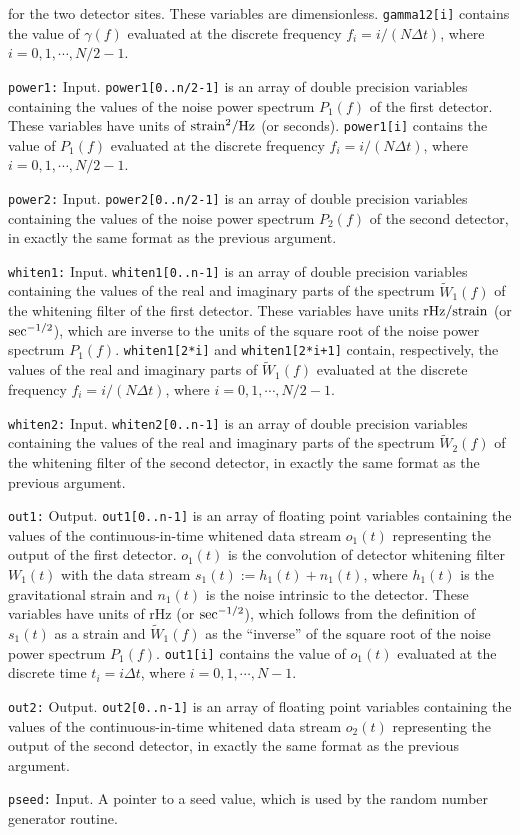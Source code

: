 \begin{description}
for the two detector sites.
These variables are dimensionless.
{\tt gamma12[i]} contains the value of $\gamma(f)$ evaluated at the 
discrete frequency $f_i=i/(N\Delta t)$, where $i=0,1,\cdots,N/2-1$.
%
\item{\tt power1:} Input.  
{\tt power1[0..n/2-1]} is an array of double precision variables 
containing the values of the noise power spectrum $P_1(f)$ of the 
first detector.
These variables have units of ${\rm strain}^2/{\rm Hz}$ (or seconds).
{\tt power1[i]} contains the value of $P_1(f)$ evaluated at the discrete
frequency $f_i=i/(N\Delta t)$, where $i=0,1,\cdots,N/2-1$.
%
\item{\tt power2:} Input.  
{\tt power2[0..n/2-1]} is an array of double precision variables 
containing the values of the noise power spectrum $P_2(f)$ of the 
second detector, in exactly the same format as the previous
argument.
%
\item{\tt whiten1:} Input.
{\tt whiten1[0..n-1]} is an array of double precision variables 
containing the values of the real and imaginary parts of the spectrum 
$\tilde W_1(f)$ of the whitening filter of the first detector.
These variables have units ${\rm rHz}/{\rm strain}$ 
(or ${\rm sec}^{-1/2}$), which are inverse to the units of the square 
root of the noise power spectrum $P_1(f)$.
{\tt whiten1[2*i]} and {\tt whiten1[2*i+1]} contain, respectively, 
the values of the real and imaginary parts of $\tilde W_1(f)$
evaluated at the discrete frequency $f_i=i/(N\Delta t)$, where 
$i=0,1,\cdots,N/2-1$.
%
\item{\tt whiten2:} Input. 
{\tt whiten2[0..n-1]} is an array of double precision variables 
containing the values of the real and imaginary parts of the spectrum 
$\tilde W_2(f)$ of the whitening filter of the second detector,
in exactly the same format as the previous argument.
%
\item{\tt out1:} Output.  
{\tt out1[0..n-1]} is an array of floating point variables containing
the values of the continuous-in-time whitened data stream $o_1(t)$ 
representing the output of the first detector.
$o_1(t)$ is the convolution of detector whitening filter $W_1(t)$
with the data stream $s_1(t):=h_1(t)+n_1(t)$, where $h_1(t)$ is the 
gravitational strain and $n_1(t)$ is the noise intrinsic to the detector.
These variables have units of rHz (or ${\rm sec}^{-1/2}$),
which follows from the definition of $s_1(t)$ as a strain and
$\tilde W_1(f)$ as the ``inverse'' of the square root 
of the noise power spectrum $P_1(f)$.
{\tt out1[i]} contains the value of $o_1(t)$ evaluated at the discrete 
time $t_i=i\Delta t$, where $i=0,1,\cdots,N-1$.
%
\item{\tt out2:} Output.  
{\tt out2[0..n-1]} is an array of floating point variables containing
the values of the continuous-in-time whitened data stream $o_2(t)$ 
representing the output of the second detector,
in exactly the same format as the previous argument.
%
\item{\tt pseed:} Input.  
A pointer to a seed value, which is used by the random number generator
routine.
\end{description}

